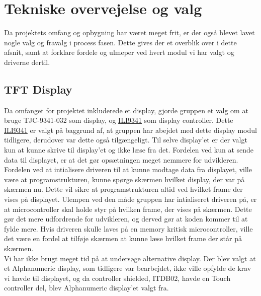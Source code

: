 \graphicspath{{Chapters/Alternative/}}


\section{Tekniske overvejelse og valg}


Da projektets omfang og opbygning har været meget frit, er der også blevet lavet nogle valg og fravalg i process fasen. Dette gives der et overblik over i dette afsnit, samt at forklare fordele og ulmeper ved hvert modul vi har valgt og driverne dertil. 

\subsection{TFT Display} 
Da omfanget for projektet inkluderede et display, gjorde gruppen et valg om at bruge TJC-9341-032 som display, og \href{https://blackboard.au.dk/bbcswebdav/pid-1697983-dt-content-rid-3847230_1/courses/BB-Cou-UUVA-73302/BB-Cou-UUVA-65758_ImportedContent_20170106021228/BB-Cou-STADS-UUVA-52360_ImportedContent_20160107025559/LAB/Lab3a%20Graphic%20LCD%20Display/Files%20for%20LAB3a/ILI9341_v1.11.pdf}{ILI9341} 
som display controller. Dette \href{https://blackboard.au.dk/bbcswebdav/pid-1697983-dt-content-rid-3847230_1/courses/BB-Cou-UUVA-73302/BB-Cou-UUVA-65758_ImportedContent_20170106021228/BB-Cou-STADS-UUVA-52360_ImportedContent_20160107025559/LAB/Lab3a%20Graphic%20LCD%20Display/Files%20for%20LAB3a/ILI9341_v1.11.pdf}{ILI9341} 
er valgt på baggrund af, at gruppen har abejdet med dette display modul tidligere, derudover var dette også tilgængeligt.
Til selve display'et er der valgt kun at kunne skrive til display'et og ikke læse fra det. Fordelen ved kun at sende data til displayet, er at det gør opsætningen meget nemmere for udvikleren. \\
Fordelen ved at intialisere driveren til at kunne modtage data fra displayet, ville være at programstrukturen, kunne spørge skærmen hvilket display, der var på skærmen nu. Dette vil sikre at programstrukturen altid ved hvilket frame der vises på displayet. Ulempen ved den måde gruppen har intialiseret driveren på, er at microcontroller skal holde styr på hvilken frame, der vises på skærmen. Dette gør det mere udfordrende for udvikleren, og derved gør at koden kommer til at fylde mere. Hvis driveren skulle laves på en memory kritisk microcontroller, ville det være en fordel at tilføje skærmen at kunne læse hvilket frame der står på skærmen. \\
Vi har ikke brugt meget tid på at undersøge alternative display. Der blev valgt at et Alphanumeric display, som tidligere var bearbejdet, ikke ville opfylde de krav vi havde til displayet, og da controller shielded, ITDB02, havde en Touch controller del, blev Alphanumeric display'et valgt fra.

